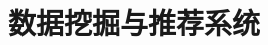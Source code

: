 \documentclass[twoside,9pt]{article}
\begin{document}
\section{数据挖掘与推荐系统}





\appendix


\nocite{*}


\end{document}
